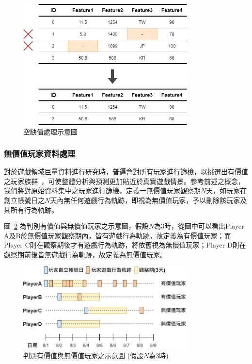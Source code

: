 \begin{figure}[!htb]
  \begin{center}
    \includegraphics[width=0.8\textwidth]{figures/Image_MissingValueHandle.png}
    \caption[空缺值處理示意圖]{空缺值處理示意圖}
    \label{fig:Image_MissingValueHandle}
  \end{center}
\end{figure}

\subsubsection{無價值玩家資料處理}
\label{subsubsec:NonValuePlayerHandle}

對於遊戲領域巨量資料進行研究時，普遍會對所有玩家進行篩檢，以挑選出有價值之玩家族群~\cite{lee2018game}，可使整體分析與預測更加貼近於真實遊戲情景。參考前述之概念，我們將對原始資料集中之玩家進行篩檢，定義一無價值玩家觀察期$N$天，如玩家在創立帳號日之$N$天內無任何遊戲行為軌跡，即視為無價值玩家，予以刪除該玩家及其所有行為軌跡。
\newpage

圖~\ref{fig:Image_DataCleaning} 為判別有價值與無價值玩家之示意圖，假設$N$為3時，從圖中可以看出Player A及B於無價值玩家觀察期內，皆有遊戲行為軌跡，故定義為有價值玩家；而Player C則在觀察期後才有遊戲行為軌跡，將依舊視為無價值玩家；Player D則在觀察期前後皆無遊戲行為軌跡，故定義為無價值玩家。

\begin{figure}[!htb]
  \begin{center}
    \includegraphics[width=0.8\textwidth]{figures/Image_DataCleaning.png}
    \caption[判別有價值與無價值玩家之示意圖]{判別有價值與無價值玩家之示意圖 (假設$N$為3時) }
    \label{fig:Image_DataCleaning}
  \end{center}
\end{figure}

